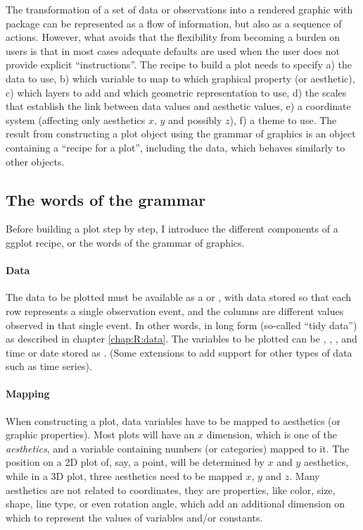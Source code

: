 \documentclass[krantz2]{krantz}\usepackage{knitr}
\begin{document}
The transformation of a set of data or observations into a rendered graphic with package  can be represented as a flow of information, but also as a sequence of actions. However, what avoids that the flexibility from becoming a burden on users is that in most cases adequate defaults are used when the user does not provide explicit ``instructions''. The recipe to build a plot needs to specify a) the data to use, b) which variable to map to which graphical property (or aesthetic), c) which layers to add and which geometric representation to use, d) the scales that establish the link between data values and aesthetic values, e) a coordinate system (affecting only aesthetics $x$, $y$ and possibly $z$), f) a theme to use. The result from constructing a plot object using the grammar of graphics is an \Rlang object containing a ``recipe for a plot'', including the data, which behaves similarly to other \Rlang objects.

\subsection{The words of the grammar}
Before building a plot step by step, I introduce the different components of a ggplot recipe, or the words of the grammar of graphics.

\paragraph{Data}
The data to be plotted must be available as a  or , with data stored so that each row represents a single observation event, and the columns are different values observed in that single event. In other words, in long form (so-called ``tidy data'') as described in chapter \ref{chap:R:data}. The variables to be plotted can be , , , and time or date stored as . (Some extensions to  add support for other types of data such as time series).

\paragraph{Mapping}
When constructing a plot, data variables have to be mapped to aesthetics (or graphic properties). Most plots will have an $x$ dimension, which is one of the \emph{aesthetics}, and a variable containing numbers (or categories) mapped to it. The position on a 2D plot of, say, a point, will be determined by $x$ and $y$ aesthetics, while in a 3D plot, three aesthetics need to be mapped $x$, $y$ and $z$. Many aesthetics are not related to coordinates, they are properties, like color, size, shape, line type, or even rotation angle, which add an additional dimension on which to represent the values of variables and/or constants.
\end{document}
